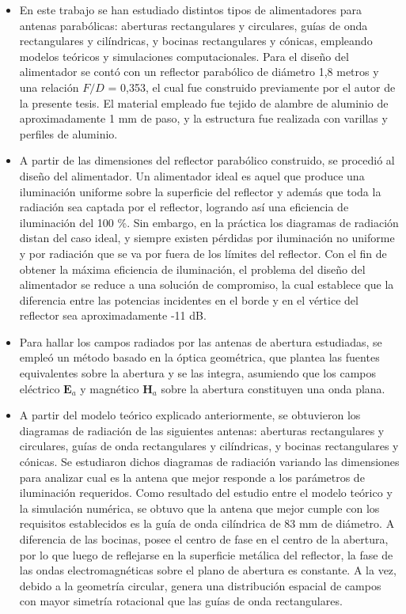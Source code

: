 

\begin{itemize}
\item En este trabajo se han estudiado distintos tipos de alimentadores para antenas parabólicas: aberturas rectangulares y circulares, guías de onda rectangulares y cilíndricas, y bocinas rectangulares y cónicas, empleando modelos teóricos y simulaciones computacionales. Para el diseño del alimentador se contó con un reflector parabólico de diámetro 1,8 metros y una relación $F/D$ = 0,353, el cual fue construido previamente por el autor de la presente tesis. El material empleado fue tejido de alambre de aluminio de aproximadamente 1 mm de paso, y la estructura fue realizada con varillas y perfiles de aluminio.
\item A partir de las dimensiones del reflector parabólico construido, se procedió al diseño del alimentador. Un alimentador ideal es aquel que produce una iluminación uniforme sobre la superficie del reflector y además que toda la radiación sea captada por el reflector, logrando así una eficiencia de iluminación del 100 \%. Sin embargo, en la práctica los diagramas de radiación distan del caso ideal, y siempre existen pérdidas por iluminación no uniforme y por radiación que se va por fuera de los límites del reflector. Con el fin de obtener la máxima eficiencia de iluminación, el problema del diseño del alimentador se reduce a una solución de compromiso, la cual establece que la diferencia entre las potencias incidentes en el borde y en el vértice del reflector sea aproximadamente -11 dB.
\item Para hallar los campos radiados por las antenas de abertura estudiadas, se empleó un método basado en la óptica geométrica, que plantea las fuentes equivalentes sobre la abertura y se las integra, asumiendo que los campos eléctrico $\mathbf{E}_a$ y magnético $\mathbf{H}_a$ sobre la abertura constituyen una onda plana.
\item A partir del modelo teórico explicado anteriormente, se obtuvieron los diagramas de radiación de las siguientes antenas: aberturas rectangulares y circulares, guías de onda rectangulares y cilíndricas, y bocinas rectangulares y cónicas. Se estudiaron dichos diagramas de radiación variando las dimensiones para analizar cual es la antena que mejor responde a los parámetros de iluminación requeridos. Como resultado del estudio entre el modelo teórico y la simulación numérica, se obtuvo que la antena que mejor cumple con los requisitos establecidos es la guía de onda cilíndrica de 83 mm de diámetro. A diferencia de las bocinas, posee el centro de fase en el centro de la abertura, por lo que luego de reflejarse en la superficie metálica del reflector, la fase de las ondas electromagnéticas sobre el plano de abertura es constante. A la vez, debido a la geometría circular, genera una distribución espacial de campos con mayor simetría rotacional que las guías de onda rectangulares.

\end{itemize}
